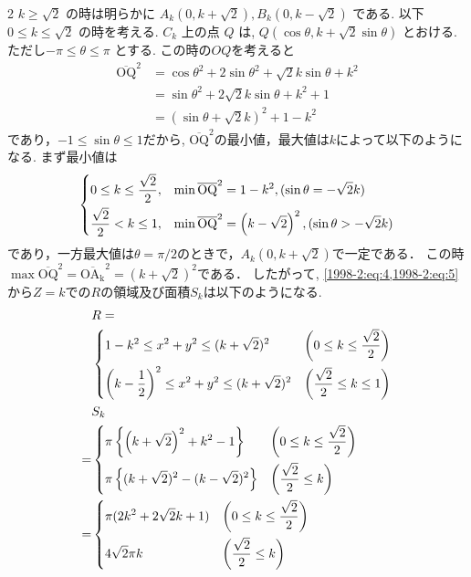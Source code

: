 \documentclass[../../main.tex]{subfiles}
\begin{document}
\begin{multicols}{2}
  $k \ge \sqrt{2}$ の時は明らかに $A_k(0, k+\sqrt{2}), B_k(0, k-\sqrt{2})$ である.
  以下 $0 \le k \le \sqrt{2}$ の時を考える.
  $C_k$ 上の点 $Q$ は, $Q(\cos\theta, k+\sqrt{2}\sin\theta)$ とおける.
  ただし$-\pi \le \theta \le \pi$ とする.
  この時の$OQ$を考えると
  \begin{align*}
    \overline{\text{OQ}}^2
     & = \cos\theta^2+2\sin\theta^2+\sqrt{2}k\sin\theta+k^2 \\
     & = \sin\theta^2+2\sqrt{2}k\sin\theta+k^2+1            \\
     & = (\sin\theta+\sqrt{2}k)^2+1-k^2
  \end{align*}
  であり，$-1 \le \sin\theta \le 1$だから,
  $\overline{\text{OQ}}^2$の最小値，最大値は$k$によって以下のようになる.
  まず最小値は
  \begin{align}\label{1998-2:eq:5}
    \begin{dcases}
      0 \le k \le \frac{\sqrt{2}}{2}, & \min \overline{\text{OQ}}^2 = 1-k^2, (\sin\theta=-\sqrt{2}k)                     \\
      \frac{\sqrt{2}}{2} < k \le 1,   & \min \overline{\text{OQ}}^2 = \left(k-\sqrt{2}\right)^2, (\sin\theta>-\sqrt{2}k)
    \end{dcases}
  \end{align}
  であり，一方最大値は$\theta=\pi/2$のときで，$A_k(0, k+\sqrt{2})$で一定である．
  この時$\max \overline{\text{OQ}}^2 = \overline{\mathrm{OA_k}}^2 = (k+\sqrt{2})^2$である．
  したがって, \cref{1998-2:eq:4,1998-2:eq:5}から$Z=k$での$R$の領域及び面積$S_k$は以下のようになる.
  \begin{align}
      & R =      \nonumber                                                                                                                       \\
      & \begin{dcases}
          1-k^2 \le x^2+y^2 \le (k+\sqrt{2})^2                        & \left(0 \le k \le \frac{\sqrt{2}}{2}\right) \\
          \left(k-\frac{1}{2}\right)^2 \le x^2+y^2 \le (k+\sqrt{2})^2 & \left(\frac{\sqrt{2}}{2} \le k \le 1\right)
        \end{dcases} \label{1998-2:eq:6} \\
      & S_k               \nonumber                                                                                                              \\
    = & \begin{dcases}
          \pi \left\{ \left(k+\sqrt{2}\right)^2 + k^2 - 1 \right\} & \left(0\le k\le \frac{\sqrt{2}}{2}\right) \\
          \pi \left\{ (k+\sqrt{2})^2-(k-\sqrt{2})^2 \right\}       & \left(\frac{\sqrt{2}}{2} \le k\right)
        \end{dcases} \nonumber      \\
    = & \begin{dcases}
          \pi (2k^2+2\sqrt{2}k+1) & \left(0\le k\le \frac{\sqrt{2}}{2}\right) \\
          4\sqrt{2}\pi k          & \left(\frac{\sqrt{2}}{2} \le k\right)
        \end{dcases} \label{1998-2:eq:7}
  \end{align}


\end{multicols}
\end{document}
